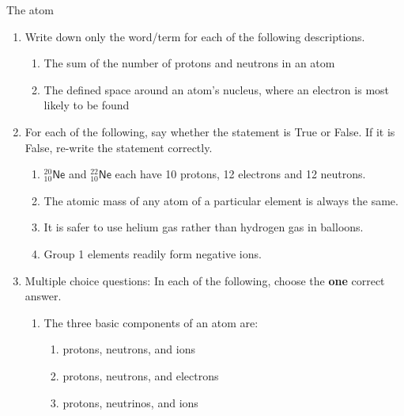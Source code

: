 \begin{eocexercises}{The atom}
            \nopagebreak
      \label{m38741*id263110}\begin{enumerate}[noitemsep, label=\textbf{\arabic*}. ] 
            \label{m38741*uid189}\item Write down only the word/term for each of the following descriptions.
\label{m38741*id263126}\begin{enumerate}[noitemsep, label=\textbf{\alph*}. ] 
            \label{m38741*uid190}\item The sum of the number of protons and neutrons in an atom
\label{m38741*uid191}\item The defined space around an atom's nucleus, where an electron is most likely to be found
\end{enumerate}
                \label{m38741*uid192}\item For each of the following, say whether the statement is True or False. If it is False, re-write the statement correctly.
\label{m38741*id263169}\begin{enumerate}[noitemsep, label=\textbf{\alph*}. ] 
            \label{m38741*uid193}\item $_{10}^{20}\mathsf{Ne}$ and $_{10}^{22}\mathsf{Ne}$ each have 10 protons, 12 electrons and 12 neutrons.
\label{m38741*uid194}\item The atomic mass of any atom of a particular element is always the same.
\label{m38741*uid195}\item It is safer to use helium gas rather than hydrogen gas in balloons.
\label{m38741*uid196}\item Group 1 elements readily form negative ions.
\end{enumerate}
                \label{m38741*uid197}\item Multiple choice questions: In each of the following, choose the \textbf{one} correct answer.
\label{m38741*id263273}\begin{enumerate}[noitemsep, label=\textbf{\alph*}. ] 
            \label{m38741*uid198}\item The three basic components of an atom are:
\label{m38741*id263289}\begin{enumerate}[noitemsep, label=\textbf{\alph*}. ] 
            \label{m38741*uid199}\item protons, neutrons, and ions
\label{m38741*uid200}\item protons, neutrons, and electrons
\label{m38741*uid201}\item protons, neutrinos, and ions

\end{enumerate}
\end{enumerate}
\end{enumerate}
\end{eocexercises}
